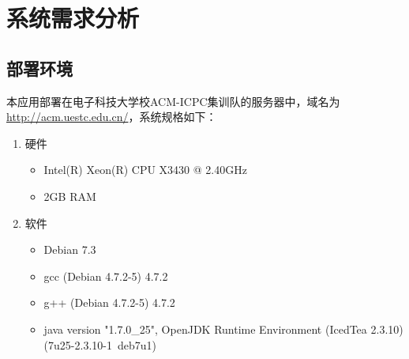 
\chapter{系统需求分析}
\section{部署环境}
本应用部署在电子科技大学校ACM-ICPC集训队的服务器中，域名为\url{http://acm.uestc.edu.cn/}，系统规格如下：
\begin{enumerate}
	\item 硬件
	\begin{itemize}
		\item Intel(R) Xeon(R) CPU X3430 @ 2.40GHz
		\item 2GB RAM
	\end{itemize}
	\item 软件
	\begin{itemize}
		\item Debian 7.3
		\item gcc (Debian 4.7.2-5) 4.7.2
		\item g++ (Debian 4.7.2-5) 4.7.2
		\item java version "1.7.0\_25", OpenJDK Runtime Environment (IcedTea 2.3.10) (7u25-2.3.10-1~deb7u1)
	\end{itemize}
\end{enumerate}

